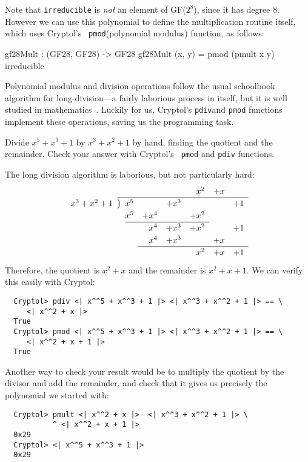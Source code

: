 Note that {\tt irreducible} is {\em not} an element of GF($2^8$),
since it has degree 8. However we can use this polynomial to define
the multiplication routine itself, which uses Cryptol's {\tt
  pmod}\indModPoly (polynomial modulus) function, as follows:
\begin{code}
  gf28Mult : (GF28, GF28) -> GF28
  gf28Mult (x, y) = pmod (pmult x y) irreducible
\end{code}
Polynomial modulus and division operations follow the usual schoolbook
algorithm for long-division---a fairly laborious process in itself,
but it is well studied in mathematics~\cite{wiki:polydiv}. Luckily for
us, Cryptol's {\tt pdiv}\indDivPoly and {\tt pmod}\indModPoly
functions implement these operations, saving us the programming task.

\begin{Exercise}\label{ex:pdivmod}
  Divide $x^5 + x^3 + 1$ by $x^3 + x^2 + 1$ by hand, finding the
  quotient and the remainder.  Check your answer with Cryptol's {\tt
    pmod} and {\tt pdiv} functions.
\end{Exercise}
\begin{Answer}
The long division algorithm is laborious, but not particularly hard:
\[
\renewcommand\arraystretch{1.2}
\begin{array}{*1r @{\hskip\arraycolsep}c@{\hskip\arraycolsep} *6r}
                &     &      &      &       & x^2   &+ x &    \\
\cline{2-8}
  x^3 + x^2 + 1 &\big)& x^5 &      & + x^3 &       &    & + 1\\
                  & & x^5 & + x^4 &      & + x^2  &    &           \\
\cline{3-6}
                  & &     & x^4  & + x^3 & + x^2 &    & + 1  \\
                  & &     & x^4  & + x^3 &       & + x&        \\
\cline{4-8}
                  & &     &      &       & x^2   & + x & + 1          \\
\end{array}
\]
Therefore, the quotient is $x^2+x$ and the remainder is $x^2+x+1$. We
can verify this easily with Cryptol:
\begin{Verbatim}
  Cryptol> pdiv <| x^^5 + x^^3 + 1 |> <| x^^3 + x^^2 + 1 |> == \
     <| x^^2 + x |>
  True
  Cryptol> pmod <| x^^5 + x^^3 + 1 |> <| x^^3 + x^^2 + 1 |> == \
     <| x^^2 + x + 1 |>
  True
\end{Verbatim}
Another way to check your result would be to multiply the quotient by
the divisor and add the remainder, and check that it gives us
precisely the polynomial we started with:
\begin{Verbatim}
  Cryptol> pmult <| x^^2 + x |>  <| x^^3 + x^^2 + 1 |> \
           ^ <| x^^2 + x + 1 |>
  0x29
  Cryptol> <| x^^5 + x^^3 + 1 |>
  0x29
\end{Verbatim}
\end{Answer}

